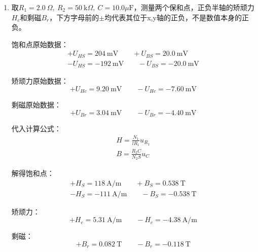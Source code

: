 \documentclass[11pt]{article}
\begin{document}
	\begin{enumerate}
		\item 取$R_1=2.0\ \Omega , \ R_2=50\ \mathrm{k}\Omega ,\ C=10.0\mu \mathrm{F}$，测量两个保和点，正负半轴的矫顽力$H_c$和剩磁$B_r$，下方字母前的$\pm$均代表其位于x,y轴的正负，不是数值本身的正负。
		
		饱和点原始数据：
		\begin{gather*}
			+U_{HS}=204\ \mathrm{mV}  \qquad +U_{BS}=20.0\ \mathrm{mV} \\
			-U_{HS}=-192\ \mathrm{mV}  \qquad -U_{BS}=-20.0\ \mathrm{mV}
		\end{gather*}
		
		矫顽力原始数据：
		\[+U_{Hc}=9.20\ \mathrm{mV} \qquad -U_{Hc}=-7.60\ \mathrm{mV}\]
		
		剩磁原始数据：
		\[+U_{Br}=3.04\ \mathrm{mV} \qquad -U_{Br}=-4.40\ \mathrm{mV} \]
		
		代入计算公式：
		\begin{gather*}
			H = \frac{N_1}{l R_1}u_{R_1}\\
			B = \frac{R_2 C}{N_2 S}u_C
		\end{gather*}
		
		解得饱和点：
		\begin{gather*}
			+H_S=118\ \mathrm{A/m} \qquad +B_S=0.538\ \mathrm{T} \\
			-H_S=-111\ \mathrm{A/m} \qquad -B_S=-0.538\ \mathrm{T}
		\end{gather*}
		
		矫顽力：
		\[+H_{c}=5.31\ \mathrm{A/m} \qquad -H_{c}=-4.38\ \mathrm{A/m}\]
		
		剩磁：
		\[+B_{r}=0.082\ \mathrm{T} \qquad -B_{r}=-0.118\ \mathrm{T}\]
		

\end{enumerate}
\end{document}
